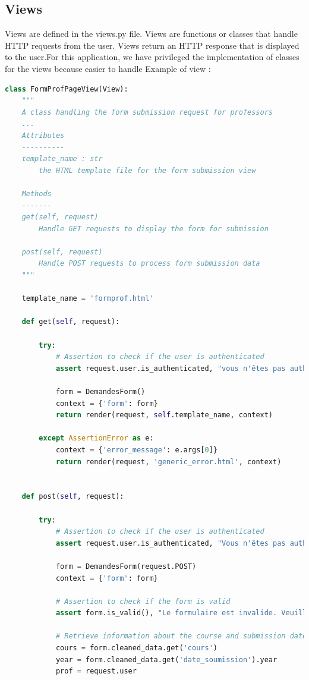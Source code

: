 \documentclass[12pt]{article}
\begin{document}
\subsection{Views}
Views are defined in the views.py file. Views are functions or classes that handle HTTP
requests from the user. Views return an HTTP response that is displayed to the user.For this
application, we have privileged the implementation of classes for the views because easier to
handle
Example of view :
\begin{lstlisting}[language=Python]
class FormProfPageView(View):
    """
    A class handling the form submission request for professors
    ...
    Attributes
    ----------
    template_name : str
        the HTML template file for the form submission view
    
    Methods
    -------
    get(self, request)
        Handle GET requests to display the form for submission
    
    post(self, request)
        Handle POST requests to process form submission data
    """
   
    template_name = 'formprof.html'
    
    def get(self, request):
        
        try:
            # Assertion to check if the user is authenticated
            assert request.user.is_authenticated, "vous n'êtes pas authentifié. Vous devez vous connecter avant de pouvoir accéder à cette page."
            
            form = DemandesForm()
            context = {'form': form}
            return render(request, self.template_name, context) 
        
        except AssertionError as e:
            context = {'error_message': e.args[0]}
            return render(request, 'generic_error.html', context)
            

    def post(self, request):
       
        try:
            # Assertion to check if the user is authenticated
            assert request.user.is_authenticated, "Vous n'êtes pas authentifié. Vous devez vous connecter avant de pouvoir accéder à cette page."

            form = DemandesForm(request.POST)
            context = {'form': form}

            # Assertion to check if the form is valid
            assert form.is_valid(), "Le formulaire est invalide. Veuillez vérifier les champs."

            # Retrieve information about the course and submission date from the request
            cours = form.cleaned_data.get('cours')
            year = form.cleaned_data.get('date_soumission').year
            prof = request.user


\end{lstlisting}
\end{document}
